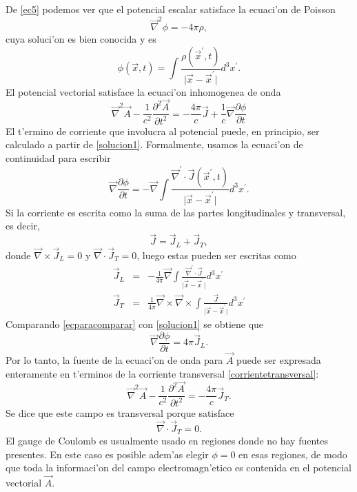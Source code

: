 De \eqref{ec5} podemos ver que el potencial escalar satisface la ecuaci'on de Poisson
\begin{equation}
\vec{\nabla}^2\phi=-4\pi\rho,
\end{equation}
cuya soluci'on es bien conocida y es
\begin{equation}
\phi(\vec{x},t)=\int \frac{\rho(\vec{x}^\prime,t)}{\vert\vec{x}-\vec{x}^\prime\vert}d^3x^\prime. \label{solucion1}
\end{equation}
El potencial vectorial satisface la ecuaci'on inhomogenea de onda
\begin{equation}
\vec{\nabla}^2\vec{A}-\frac{1}{c^2}\frac{\partial^2\vec{A}}{\partial t^2}=-\frac{4\pi}{c}\vec{J}+\frac{1}{c}\vec{\nabla}\frac{\partial\phi}{\partial t}
\end{equation}
El t'ermino de corriente que involucra al potencial puede, en principio, ser calculado a partir de \eqref{solucion1}. Formalmente, usamos la ecuaci'on de continuidad para escribir
\begin{equation}
\vec{\nabla}\frac{\partial \phi}{\partial t}=-\vec{\nabla}\int\frac{\vec{\nabla}^\prime\cdot\vec{J}(\vec{x}^\prime,t)}{\vert\vec{x}-\vec{x}^\prime\vert}d^3x^\prime. \label{ecparacomparar}
\end{equation}
Si la corriente es escrita como la suma de las partes longitudinales y transversal, es decir,
\begin{equation}
\vec{J}=\vec{J}_L+\vec{J}_T,
\end{equation}
donde $\vec{\nabla}\times\vec{J}_L=0$ y $\vec{\nabla}\cdot\vec{J}_T=0$, luego estas pueden ser escritas como
\begin{eqnarray}
\vec{J}_L&=&-\frac{1}{4\pi}\vec{\nabla}\int\frac{\vec{\nabla}^\prime\cdot\vec{J}}{\vert\vec{x}-\vec{x}^\prime\vert}d^3x^\prime \label{ecparacomparar1} \\
\vec{J}_T&=&\frac{1}{4\pi}\vec{\nabla}\times\vec{\nabla}\times\int\frac{\vec{J}}{\vert\vec{x}-\vec{x}^\prime\vert}d^3x^\prime \label{corrientetransversal}
\end{eqnarray}
Comparando \eqref{ecparacomparar} con \eqref{solucion1} se obtiene que
\begin{equation}
\vec{\nabla}\frac{\partial\phi}{\partial t}=4\pi\vec{J}_L. \label{comparacion}
\end{equation}
Por lo tanto, la fuente de la ecuaci'on de onda para $\vec{A}$ puede ser expresada enteramente en t'erminos de la corriente transversal \eqref{corrientetransversal}:
\begin{equation}
\vec{\nabla}^2\vec{A}-\frac{1}{c^2}\frac{\partial^2\vec{A}}{\partial t^2}=-\frac{4\pi}{c}\vec{J}_T.
\end{equation}
Se dice que este campo es transversal porque satisface
\begin{equation}
\vec{\nabla}\cdot\vec{J}_T=0.
\end{equation}
El gauge de Coulomb es usualmente usado en regiones donde no hay fuentes presentes. En este caso es posible adem'as elegir $\phi=0$ en esas regiones, de modo que toda la informaci'on del campo electromagn'etico es contenida en el potencial vectorial $\vec{A}$.
